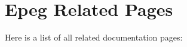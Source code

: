 \section{Epeg Related Pages}
Here is a list of all related documentation pages:\begin{CompactList}
\item {}

\end{CompactList}
